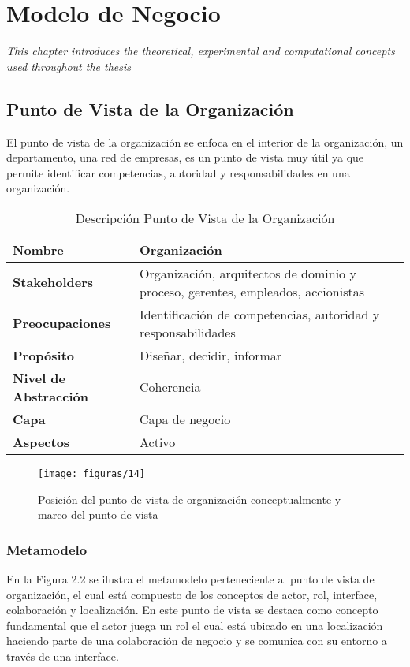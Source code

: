 \chapter{Modelo de Negocio}
\label{chap:Negocio}
\textit{This chapter introduces the theoretical, experimental and computational concepts used throughout the thesis}
\vspace{2ex}\vfill
\minitoc
\newpage

\section{Punto de Vista de la Organización}
 El punto de vista de la organización se enfoca en el interior de la organización, un departamento, una red de empresas, es un punto de vista muy útil ya que permite identificar  competencias, autoridad y responsabilidades en una organización.
 
  \begin{table}[H]
	\centering
	\begin{tabular}{lp{8cm}}
		\toprule
		\textbf{Nombre} & \textbf{Organización} \\
		\midrule
		\textbf{Stakeholders} & Organización, arquitectos de dominio y proceso, gerentes, empleados, accionistas \\
		\textbf{Preocupaciones} & Identificación de competencias, autoridad y responsabilidades \\
		\textbf{Propósito} & Diseñar, decidir, informar \\
		\textbf{Nivel de Abstracción} & Coherencia \\
		\textbf{Capa} & Capa de negocio \\
		\textbf{Aspectos} & Activo \\
		\bottomrule
	\end{tabular}
	\captionsetup{width=.95\textwidth}
	\caption{Descripción Punto de Vista de la Organización}
	\label{tabla4}
  \end{table}

  \begin{figure}[!h]
 	\centering
 	\texttt{[image: figuras/14]}
 	\captionsetup{width=.95\textwidth}
 	\caption{Posición del punto de vista de organización conceptualmente y marco del punto de vista}
 	\label{figura14}
  \end{figure}

  \subsection{Metamodelo}
  En la Figura 2.2 se ilustra el metamodelo perteneciente al punto de vista de organización, el cual está compuesto de los conceptos de actor, rol, interface, colaboración y localización. En este punto de vista se destaca como concepto fundamental que el actor juega un rol el cual está ubicado en una localización haciendo parte de una colaboración de negocio y se comunica con su entorno a través de una interface.
 
